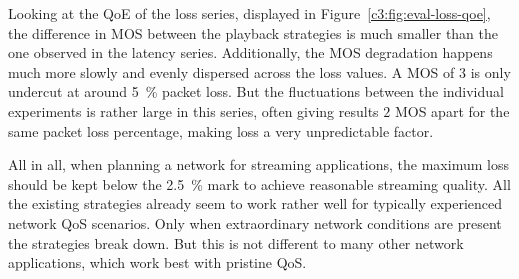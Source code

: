 Looking at the \gls{QoE} of the loss series, displayed in Figure~\ref{c3:fig:eval-loss-qoe}, the difference in \gls{MOS} between the playback strategies is much smaller than the one observed in the latency series. Additionally, the \gls{MOS} degradation happens much more slowly and evenly dispersed across the loss values. A \gls{MOS} of $3$ is only undercut at around \SI{5}{\percent} packet loss. But the fluctuations between the individual experiments is rather large in this series, often giving results $2$ \gls{MOS} apart for the same packet loss percentage, making loss a very unpredictable factor.

All in all, when planning a network for streaming applications, the maximum loss should be kept below the \SI{2.5}{\percent} mark to achieve reasonable streaming quality. All the existing strategies already seem to work rather well for typically experienced network \gls{QoS} scenarios. Only when extraordinary network conditions are present the strategies break down. But this is not different to many other network applications, which work best with pristine \gls{QoS}.












